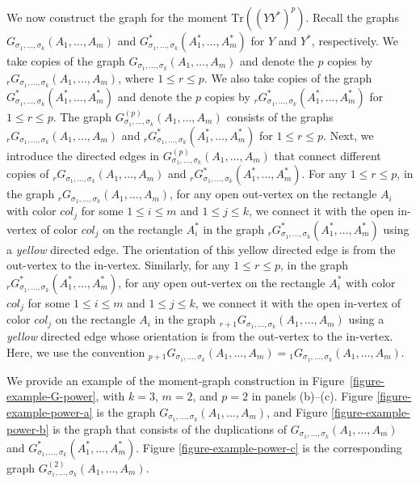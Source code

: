 \documentclass[12pt]{article}
\numberwithin{equation}{section}
\theoremstyle{plain}
\def\Tr{\mathrm {Tr}}
\begin{document}
We now construct the graph for the moment $\Tr ((YY^*)^p)$.
Recall the graphs $G_{\sigma_1,\ldots,\sigma_k} (A_1, \ldots, A_m)$ and $G^*_{\sigma_1,\ldots,\sigma_k} (A_1^*, \ldots, A_m^*)$ for $Y$ and $Y^*$, respectively.
We take copies of the graph $G_{\sigma_1,\ldots,\sigma_k} (A_1, \ldots, A_m)$ and denote the $p$ copies by ${}_rG_{\sigma_1,\ldots,\sigma_k} (A_1, \ldots, A_m)$, where $1 \le r \le p$.
We also take copies of the graph $G^*_{\sigma_1,\ldots,\sigma_k} (A_1^*, \ldots, A_m^*)$ and denote the $p$ copies by ${}_rG^*_{\sigma_1,\ldots,\sigma_k} (A_1^*, \ldots, A_m^*)$ for $1 \le r \le p$.
The graph $G^{(p)}_{\sigma_1,\ldots,\sigma_k} (A_1, \ldots, A_m)$ consists of the graphs ${}_rG_{\sigma_1,\ldots,\sigma_k} (A_1, \ldots, A_m)$ and ${}_rG^*_{\sigma_1,\ldots,\sigma_k} (A_1^*, \ldots, A_m^*)$ for $1 \le r \le p$.
Next, we introduce the directed edges in $G^{(p)}_{\sigma_1,\ldots,\sigma_k} (A_1, \ldots, A_m)$ that connect different copies of ${}_rG_{\sigma_1,\ldots,\sigma_k} (A_1, \ldots, A_m)$ and ${}_rG^*_{\sigma_1,\ldots,\sigma_k} (A_1^*, \ldots, A_m^*)$.
For any $1 \le r \le p$, in the graph ${}_rG_{\sigma_1,\ldots,\sigma_k} (A_1, \ldots, A_m)$, for any open out-vertex on the rectangle $A_i$ with color $col_j$ for some $1 \le i \le m$ and $1 \le j \le k$, we connect it with the open in-vertex of color $col_j$ on the rectangle $A_i^*$ in the graph ${}_rG^*_{\sigma_1,\ldots,\sigma_k} (A_1^*, \ldots, A_m^*)$ using a \emph{yellow} directed edge. The orientation of this yellow directed edge is from the out-vertex to the in-vertex.
Similarly, for any $1 \le r \le p$, in the graph ${}_rG^*_{\sigma_1,\ldots,\sigma_k} (A_1^*, \ldots, A_m^*)$, for any open out-vertex on the rectangle $A_i^*$ with color $col_j$ for some $1 \le i \le m$ and $1 \le j \le k$, we connect it with the open in-vertex of color $col_j$ on the rectangle $A_i$ in the graph ${}_{r+1}G_{\sigma_1,\ldots,\sigma_k} (A_1, \ldots, A_m)$ using a \emph{yellow} directed edge whose orientation is from the out-vertex to the in-vertex. Here, we use the convention ${}_{p+1}G _{\sigma_1,\ldots,\sigma_k} (A_1, \ldots, A_m) = {}_1G_{\sigma_1,\ldots,\sigma_k} (A_1, \ldots, A_m)$.

We provide an example of the moment-graph construction in Figure~\ref{figure-example-G-power}, with $k=3$, $m=2$, and $p=2$ in panels (b)--(c). Figure \ref{figure-example-power-a} is the graph $G_{\sigma_1,\ldots,\sigma_k} (A_1, \ldots, A_m)$, and Figure \ref{figure-example-power-b} is the graph that consists of the duplications of $G_{\sigma_1,\ldots,\sigma_k} (A_1, \ldots, A_m)$ and $G^*_{\sigma_1,\ldots,\sigma_k} (A_1^*, \ldots, A_m^*)$. Figure \ref{figure-example-power-c} is the corresponding graph $G^{(2)}_{\sigma_1,\ldots,\sigma_k} (A_1, \ldots, A_m)$.
\end{document}
